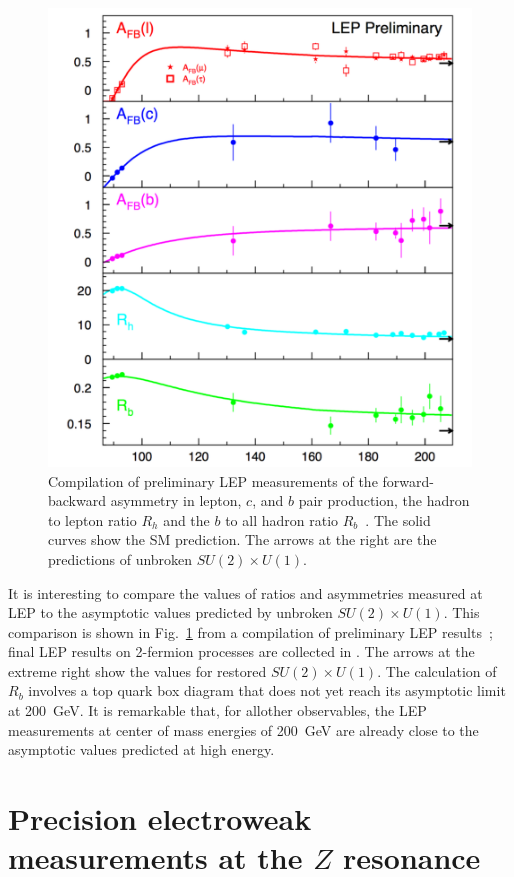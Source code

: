 \documentclass[12pt]{article}
\begin{document}
\begin{figure}
\begin{center}
\includegraphics[width=0.70\hsize]{Hildreth.pdf}
\end{center}
\caption{Compilation of preliminary LEP
  measurements of the forward-backward asymmetry in lepton, $c$, and
  $b$ pair production, the hadron to lepton ratio $R_h$ and the $b$ to
  all hadron ratio $R_b$~\cite{Hildreth}.  The solid curves show the SM
  prediction.  The arrows at the right are the predictions of unbroken
  $SU(2)\times U(1)$.}
\label{fig:Hildreth}
\end{figure}


It is interesting to compare the values of ratios and asymmetries
measured at LEP to the asymptotic values predicted by unbroken
$SU(2)\times U(1)$.   This comparison is shown in
Fig.~\ref{fig:Hildreth} from a compilation of preliminary LEP
results~\cite{Hildreth}; final LEP results on 2-fermion processes are
collected in \cite{finalLEP}.   The arrows at the extreme right show
the values for restored $SU(2)\times U(1)$.  The calculation of $R_b$
involves a top quark box diagram that does not yet reach its
asymptotic limit at 200~GeV.   It is remarkable that,
for allother  observables, the LEP measurements at center of mass
energies of 200~GeV  are already close
to the asymptotic values predicted at high energy.



\section{Precision electroweak measurements
 at the $Z$ resonance}
\end{document}
